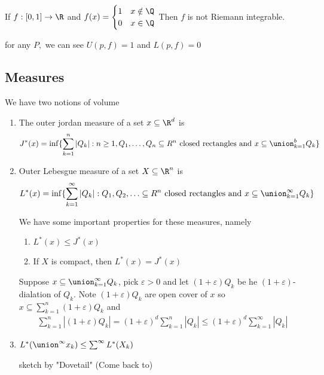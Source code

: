 \begin{example}
	If $f:[0,1] \to \R$ and $f(x) = 
	\begin{cases}
		1 & x\notin \Q \\
		0 & x\in \Q
	\end{cases} $
	Then $f$ is not Riemann integrable. \\
	\begin{solution}
		for any $P,$ we can see  $U(p,f) = 1$ and  $L(p,f) = 0$
	\end{solution}
\end{example}

\subsection{Measures}

We have two notions of volume
\begin{enumerate}
	\item The outer jordan measure of a set $x \subseteq \R^d$ is
		\begin{align*}
			J^* (x) 
			= \inf\{ \sum_{k=1}^{n} |Q_k| : n \geq 1, Q_1, \ldots, Q_n \subseteq R^n  \text{ closed rectangles and }
			x \subseteq \union_{k=1}^{b} Q_k \}
		\end{align*}
	\item Outer Lebesgue measure of a set $X \subseteq \R^n$ is 
		\begin{align*}
			L^*(x) = \inf\{ \sum_{k=1}^{\infty}|Q_k| : Q_1, Q_2, \ldots \subseteq R^n  \text{ closed rectangles and }
			x \subseteq \union_{k=1}^{\infty} Q_k \}
		\end{align*} 

		We have some important properties for these measures, namely

		\begin{enumerate}
			\item $L^*(x) \leq J^* (x)$
			\item If  $X$ is compact, then $L^*(x) = J^*(x)$
		\end{enumerate}
		\begin{solution}
			Suppose $x \subseteq \union_{k=1}^{\infty} Q_k$, pick $\varepsilon > 0$ and let  $(1 + \varepsilon)Q_k$ be he $(1 + \varepsilon)$-dialation of $Q_k$. Note $(1+ \varepsilon ) Q_k$ are open cover of  $x$ so $x \subseteq \sum_{k=1}^n (1+\varepsilon) Q_k$ and
			\begin{align*}
				\sum_{k=1}^{n} |(1 + \varepsilon) Q_k| = (1+\varepsilon)^d \sum_{k=1}^{n}|Q_k| \leq (1 + \varepsilon)^d \sum_{k=1}^{\infty} | Q_k|
			\end{align*} 
		\end{solution}

	\item $L^* (\union^{\infty} x_k ) \leq \sum_{}^{\infty} L^* (X_{k})$

		\begin{solution}
			sketch by "Dovetail" (Come back to)
		\end{solution}
\end{enumerate}

